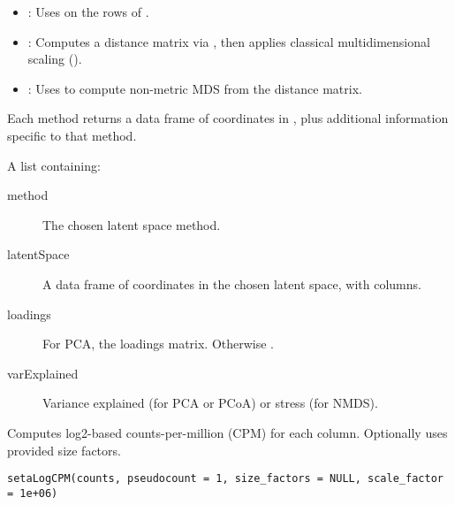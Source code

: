 \documentclass[a4paper]{book}
\begin{document}
%
\begin{Details}
\begin{itemize}

\item{} : Uses  on the rows of .
\item{} : Computes a distance matrix via , then
applies classical multidimensional scaling ().
\item{} : Uses  to compute non-metric MDS from the distance matrix.

\end{itemize}

Each method returns a data frame of coordinates in , plus additional information
specific to that method.
\end{Details}
%
\begin{Value}
A list containing:
\begin{description}

\item[method] The chosen latent space method.
\item[latentSpace] A data frame of coordinates in the chosen latent space, with  columns.
\item[loadings] For PCA, the loadings matrix. Otherwise .
\item[varExplained] Variance explained (for PCA or PCoA) or stress (for NMDS).

\end{description}

\end{Value}
%
\begin{Examples}
\end{Examples}
%
\begin{Description}
Computes log2-based counts-per-million (CPM) for each column. Optionally uses provided size factors.
\end{Description}
%
\begin{Usage}
\begin{verbatim}
setaLogCPM(counts, pseudocount = 1, size_factors = NULL, scale_factor = 1e+06)
\end{verbatim}
\end{Usage}
\end{document}
